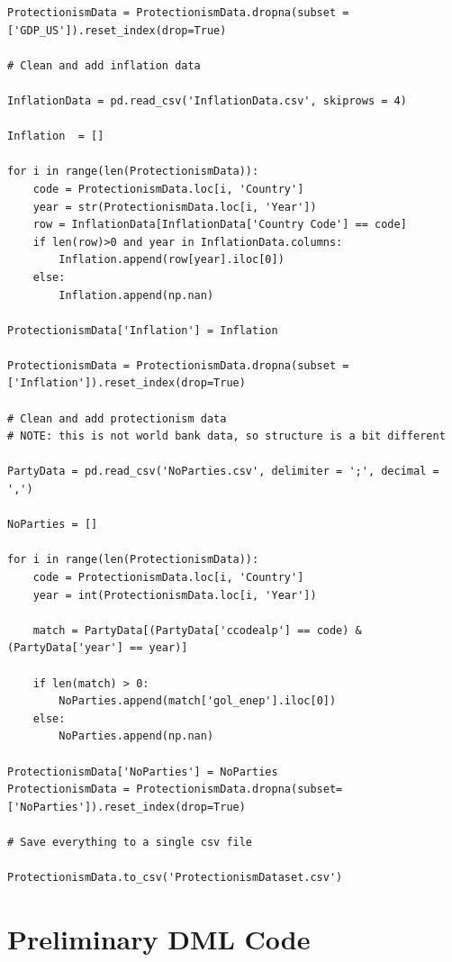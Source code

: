 \documentclass[11pt]{article}
\begin{document}
\begin{lstlisting}
ProtectionismData = ProtectionismData.dropna(subset = ['GDP_US']).reset_index(drop=True)

# Clean and add inflation data

InflationData = pd.read_csv('InflationData.csv', skiprows = 4)

Inflation  = []

for i in range(len(ProtectionismData)):
    code = ProtectionismData.loc[i, 'Country']
    year = str(ProtectionismData.loc[i, 'Year'])
    row = InflationData[InflationData['Country Code'] == code]
    if len(row)>0 and year in InflationData.columns:
        Inflation.append(row[year].iloc[0])
    else:
        Inflation.append(np.nan)

ProtectionismData['Inflation'] = Inflation

ProtectionismData = ProtectionismData.dropna(subset = ['Inflation']).reset_index(drop=True)

# Clean and add protectionism data
# NOTE: this is not world bank data, so structure is a bit different

PartyData = pd.read_csv('NoParties.csv', delimiter = ';', decimal = ',')

NoParties = []

for i in range(len(ProtectionismData)):
    code = ProtectionismData.loc[i, 'Country']
    year = int(ProtectionismData.loc[i, 'Year'])

    match = PartyData[(PartyData['ccodealp'] == code) & (PartyData['year'] == year)]

    if len(match) > 0:
        NoParties.append(match['gol_enep'].iloc[0])
    else:
        NoParties.append(np.nan)

ProtectionismData['NoParties'] = NoParties
ProtectionismData = ProtectionismData.dropna(subset=['NoParties']).reset_index(drop=True)

# Save everything to a single csv file

ProtectionismData.to_csv('ProtectionismDataset.csv') 
\end{lstlisting}

\section{Preliminary DML Code}
\end{document}
